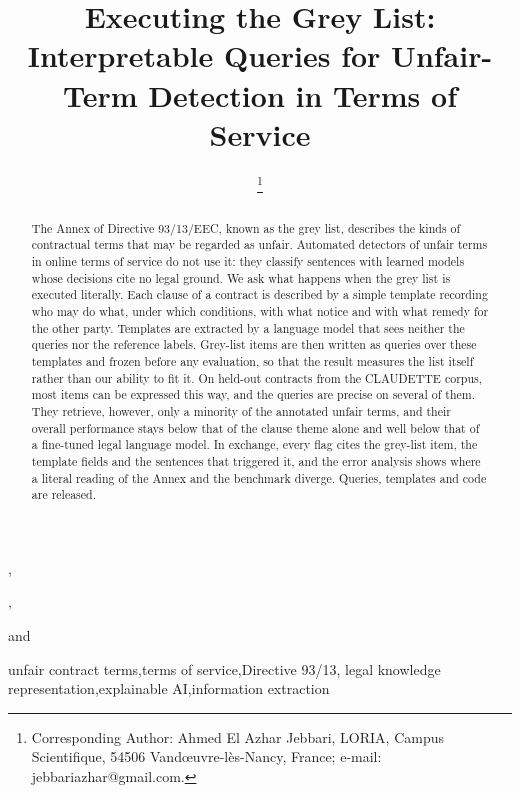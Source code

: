 \documentclass{IOS-Book-Article}
\newcommand{\corpus}{CLAUDETTE}
\begin{document}
\begin{frontmatter}
\title{Executing the Grey List: Interpretable Queries for Unfair-Term Detection in Terms of Service}
\author[A]{ %
\thanks{Corresponding Author: Ahmed El Azhar Jebbari, LORIA, Campus Scientifique, 54506 Vandœuvre-lès-Nancy, France; e-mail: jebbariazhar@gmail.com.}},
\author[A]{ },
\author[B]{ }
and
\author[C]{ }
\address[A]{LORIA, Université de Lorraine, CNRS, Inria, Nancy, France}
\address[B]{Juristiadata, France}
\address[C]{Faculty of Legal Sciences, Rabat, Morocco}

\begin{abstract}
The Annex of Directive 93/13/EEC, known as the grey list, describes the kinds of contractual terms that may be regarded as unfair. Automated detectors of unfair terms in online terms of service do not use it: they classify sentences with learned models whose decisions cite no legal ground. We ask what happens when the grey list is executed literally. Each clause of a contract is described by a simple template recording who may do what, under which conditions, with what notice and with what remedy for the other party. Templates are extracted by a language model that sees neither the queries nor the reference labels. Grey-list items are then written as queries over these templates and frozen before any evaluation, so that the result measures the list itself rather than our ability to fit it. On held-out contracts from the \corpus{} corpus, most items can be expressed this way, and the queries are precise on several of them. They retrieve, however, only a minority of the annotated unfair terms, and their overall performance stays below that of the clause theme alone and well below that of a fine-tuned legal language model. In exchange, every flag cites the grey-list item, the template fields and the sentences that triggered it, and the error analysis shows where a literal reading of the Annex and the benchmark diverge. Queries, templates and code are released.
\end{abstract}

\begin{keyword}
unfair contract terms\sep terms of service\sep Directive 93/13\sep
legal knowledge representation\sep explainable AI\sep information extraction
\end{keyword}
\end{frontmatter}
\end{document}
